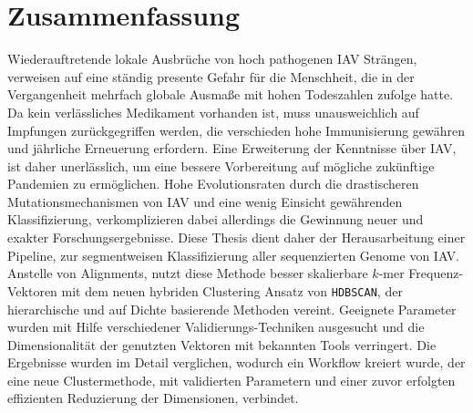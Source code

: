 \chapter*{Zusammenfassung}

Wiederauftretende lokale Ausbrüche von hoch pathogenen \gls{IAV} Strängen, verweisen auf eine ständig presente Gefahr für die Menschheit, die in der Vergangenheit mehrfach globale Ausmaße mit hohen Todeszahlen zufolge hatte. Da kein verlässliches Medikament vorhanden ist, muss unausweichlich auf Impfungen zurückgegriffen werden, die verschieden hohe Immunisierung gewähren und jährliche Erneuerung erfordern. Eine Erweiterung der Kenntnisse über \gls{IAV}, ist daher unerlässlich, um eine bessere Vorbereitung auf mögliche zukünftige Pandemien zu ermöglichen. Hohe Evolutionsraten durch die drastischeren Mutationsmechanismen von \gls{IAV} und eine wenig Einsicht gewährenden Klassifizierung, verkomplizieren dabei allerdings die Gewinnung neuer und exakter Forschungsergebnisse. Diese Thesis dient daher der Herausarbeitung einer Pipeline, zur segmentweisen Klassifizierung aller sequenzierten Genome von \gls{IAV}. Anstelle von Alignments, nutzt diese Methode besser skalierbare $k$-mer Frequenz-Vektoren mit dem neuen hybriden Clustering Ansatz von \texttt{HDBSCAN}, der hierarchische und auf Dichte basierende Methoden vereint. Geeignete Parameter wurden mit Hilfe verschiedener Validierungs-Techniken ausgesucht und die Dimensionalität der genutzten Vektoren mit bekannten Tools verringert. Die Ergebnisse wurden im Detail verglichen, wodurch ein Workflow kreiert wurde, der eine neue Clustermethode, mit validierten Parametern und einer zuvor erfolgten effizienten Reduzierung der Dimensionen, verbindet.